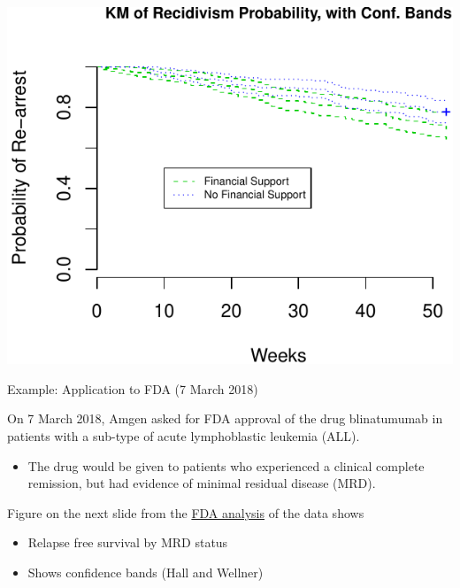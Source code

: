 \documentclass[ignorenonframetext,]{beamer}
\providecommand{\tightlist}{%
  \setlength{\itemsep}{0pt}\setlength{\parskip}{0pt}}
\begin{document}
\begin{frame}

\includegraphics{unit_02_estimation_files/figure-beamer/unnamed-chunk-10-1.pdf}

\end{frame}

\begin{frame}{%
\protect\hypertarget{example-application-to-fda-7-march-2018}{%
Example: Application to FDA (7 March 2018)}}

On 7 March 2018, Amgen asked for FDA approval of the drug blinatumumab
in patients with a sub-type of acute lymphoblastic leukemia (ALL).

\begin{itemize}
\tightlist
\item
  The drug would be given to patients who experienced a clinical
  complete remission, but had evidence of minimal residual disease
  (MRD).
\end{itemize}

Figure on the next slide from the
\href{https://www.fda.gov/downloads/AdvisoryCommittees/CommitteesMeetingMaterials/Drugs/OncologicDrugsAdvisoryCommittee/UCM599298.pdf}{FDA
analysis} of the data shows

\begin{itemize}
\item
  Relapse free survival by MRD status
\item
  Shows confidence bands (Hall and Wellner)
\end{itemize}

\end{frame}
\end{document}
